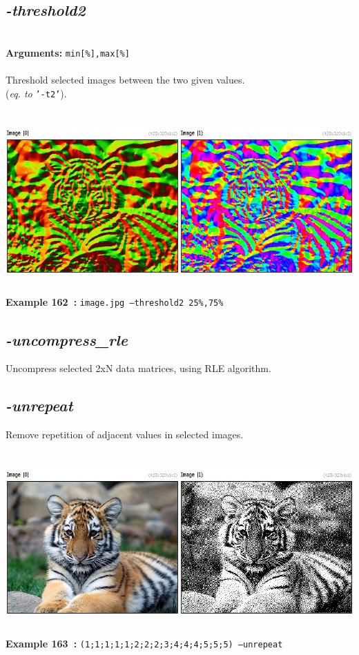 \documentclass[a4paper,11pt,twoside]{book}
\begin{document}
\subsection{\emph{-threshold2} }\vspace*{-0.5em}
~\\\textbf{Arguments: } 
{\small \texttt{min[\%],max[\%]}}\\~\\
Threshold selected images between the two given values.
~\\(\emph{eq. to} {\small \texttt{'-t2'}}).
\begin{center}\includegraphics[keepaspectratio=true,height=7cm,width=\textwidth]{img/gmic_def162.jpg}\\
{\footnotesize \textbf{Example 162~:} \texttt{image.jpg --threshold2 25\%,75\%}}
\end{center}

\subsection{\emph{-uncompress\_rle} }\vspace*{-0.5em}
Uncompress selected 2xN data matrices, using RLE algorithm.


\subsection{\emph{-unrepeat} }\vspace*{-0.5em}
Remove repetition of adjacent values in selected images.
\begin{center}\includegraphics[keepaspectratio=true,height=7cm,width=\textwidth]{img/gmic_def163.jpg}\\
{\footnotesize \textbf{Example 163~:} \texttt{(1;1;1;1;1;2;2;2;3;4;4;4;5;5;5) --unrepeat}}
\end{center}
\end{document}
